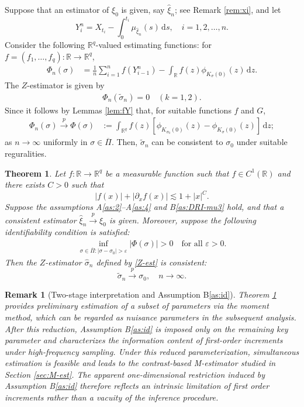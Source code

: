 \documentclass[a4paper,10pt,twoside]{article}
\newtheorem{thm}{Theorem}[section]
\newtheorem{remark}{Remark}[section]
\numberwithin{equation}{section}
\def\R{\mathbb{R}}
\def\l{\left}
\def\r{\right}
\def\s{\sigma}
\def\p{\partial}
\def\toP{\stackrel{p}{\longrightarrow}}
\def\wh#1{\widehat{#1}}
\def\ol#1{\overline{#1}}
\def\wt#1{\widetilde{#1}}
\def\df{\mathrm{d}}
\begin{document}
Suppose that an estimator of $\xi_0$ is given, say $\wh{\xi}_n$; see Remark \ref{rem:xi}, and let 
\[
Y_i^n = X_{t_i} - \int_0^{t_i} \mu_{\wh{\xi}_n}(s)\,\df s,\quad i=1,2,\dots,n. 
\]
Consider the following $\R^q$-valued estimating functions: for $f=(f_1,\dots,f_q):\R\to \R^q$, 
\begin{align*}
\Phi_n(\s) &= \frac{1}{n}\sum_{i=1}^n f(Y_{i-1}^n) - \int_\R f(z)\phi_{K_\s(0)}(z)\,\df z. %
\end{align*}
The $Z$-estimator is given by 
\begin{align}
\Phi_n(\wt{\s}_n) = 0\quad (k=1,2). \label{Z-est}
\end{align}
Since it follows by Lemmas \ref{lem:fY} that, for suitable functions $f$ and $G$, 
\begin{align*}
\Phi_n(\s) \toP \Phi(\s)&:=  \int_{\R^q}f(z)\l[\phi_{K_{\s_0}(0)}(z) - \phi_{K_\s(0)}(z)\r]\,\df z;
\end{align*}
as $n\to \infty$ uniformly in $\s\in \ol{\Pi}$. 
Then, $\wt{\s}_n$ can be consistent to $\s_0$ under suitable reguralities. 



\begin{thm}\label{thm:M-consist}
Let $f : \R \to \R^q$ be a measurable function such that $f \in C^1(\R)$ and there exists $C > 0$ such that
\[
|f(x)| + |\p_x f(x)| \lesssim 1 + |x|^C.
\]
Suppose the assumptions A\ref{as:2}--A\ref{as:4} and B\ref{as:DRI-mu3} hold, and that a consistent estimator $\widehat{\xi}_n \toP \xi_0$ is given. 
Moreover, suppose the following identifiability condition is satisfied:
\begin{align}
\inf_{\sigma \in \overline{\Pi} : |\sigma - \sigma_0| > \varepsilon} |\Phi(\sigma)| > 0 \quad \text{for all } \varepsilon > 0.
\label{Phi-identifiable}
\end{align}
Then the $Z$-estimator $\widehat{\sigma}_n$ defined by \eqref{Z-est} is consistent:
\[
\wt{\s}_n \toP \sigma_0, \quad n \to \infty. 
\]
\end{thm}

\begin{remark}[Two-stage interpretation and Assumption B\ref{as:id}] 
Theorem \ref{thm:M-consist} provides preliminary estimation of a subset of parameters via the moment method, which can be regarded as nuisance parameters in the subsequent analysis.
After this reduction, Assumption B\ref{as:id} is imposed only on the remaining key parameter and characterizes the information content of first-order increments under high-frequency sampling.
Under this reduced parameterization, simultaneous estimation is feasible and leads to the contrast-based M-estimator studied in Section \ref{sec:M-est}.
The apparent one-dimensional restriction induced by Assumption B\ref{as:id} therefore reflects an intrinsic limitation of first order increments rather than a vacuity of the inference procedure.
\end{remark}
\end{document}
